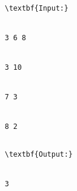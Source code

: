 \begin{verbatim}
\textbf{Input:}


3 6 8


3 10


7 3


8 2


\end{verbatim}
\begin{itemize}
\end{itemize}
\begin{verbatim}
\textbf{Output:}


3


\end{verbatim}